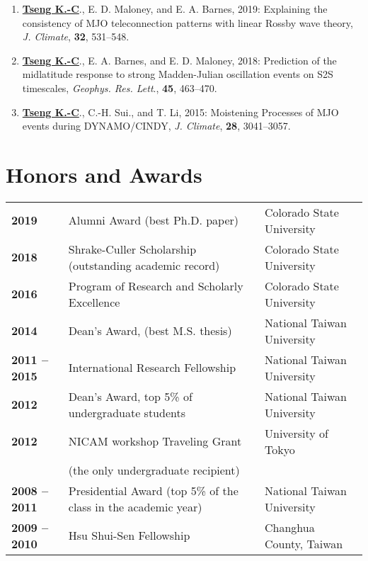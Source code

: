 \documentclass{article}
\begin{document}
\begin{enumerate}
	\item \normalsize{\bf{\underline{Tseng K.-C}}}., E. D. Maloney, and E. A. Barnes, 2019: Explaining the consistency of MJO teleconnection patterns with linear Rossby wave theory, \textit{J. Climate}, \normalsize{\bf{32}}, 531--548.
	\item \normalsize{\bf{\underline{Tseng K.-C}}}., E. A. Barnes, and E. D. Maloney, 2018: Prediction of the midlatitude response to strong Madden-Julian oscillation events on S2S timescales, \textit{Geophys. Res. Lett}., \normalsize{\bf{45}}, 463--470. \par
	\item \normalsize{\bf{\underline{Tseng K.-C}}}., C.-H. Sui., and T. Li, 2015: Moistening Processes of MJO events during DYNAMO/CINDY, \textit{J. Climate}, \normalsize{\bf{28}}, 3041--3057.
    \end{enumerate}


\section{\color{airforceblue}Honors and Awards}
\begin{tabular}{>{\bfseries}p{2.5cm}p{10cm}p{\linewidth-2.5cm\relax}}
     2019   & Alumni Award (best Ph.D. paper) & Colorado State University 
     \\
     2018   & Shrake-Culler Scholarship (outstanding academic record) & Colorado State University 
     \\  
	 2016   & Program of Research and Scholarly Excellence & Colorado State University 
	 \\
     2014  & Dean’s Award, (best M.S. thesis) & National Taiwan University 
     \\
     2011 -- 2015 & International Research Fellowship & National Taiwan University 
     \\
     2012        & Dean’s Award, top 5\% of undergraduate students & National Taiwan University  
     \\
     2012        & NICAM workshop Traveling Grant  & University of Tokyo
     \\
                  & (the only undergraduate recipient)                                            &  \\  
     2008 -- 2011 & Presidential Award (top 5\% of the class in the academic year) & National Taiwan University 
     \\

     2009 -- 2010 & Hsu Shui-Sen Fellowship   & Changhua County, Taiwan 
     
\end{tabular}
\end{document}
